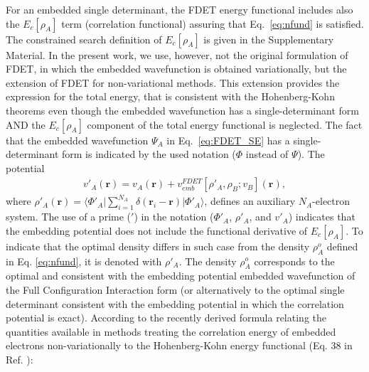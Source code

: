 \documentclass[amsmath,amssymb,preprint,aip,jcp]{revtex4-1}
\begin{document}
For an embedded single determinant, {\color{red}the FDET energy functional  includes also the $E_c[\rho_A]$ term (correlation functional)  assuring that   Eq.~\ref{eq:nfund} is satisfied. The constrained search definition of $E_c[\rho_A]$ is given in the Supplementary Material. }
{\color{red}
In the present work, we use, however, not the original formulation of FDET, in which  the embedded wavefunction is obtained variationally, but the extension of FDET for non-variational methods\cite{Wesolowski2020}. 
This extension provides the expression for the total energy, that is consistent with the Hohenberg-Kohn theorems even though the embedded wavefunction has a single-determinant form AND the $E_c[\rho_A]$ component of the total energy functional is neglected.} 
The fact that the embedded  wavefunction $\Psi_A$ in Eq.~\ref{eq:FDET_SE} has a single-determinant form is indicated by the used notation ($\Phi$ instead of $\Psi$). 
The potential
\begin{eqnarray}
v'_A(\mathbf{r})=v_A(\mathbf{r})+v_{emb}^{{FDET}}[\rho'_A,\rho_B; v_B](\mathbf{r})\label{eq:def_v'},
\end{eqnarray}
where $\rho'_A(\mathbf{r})=\langle\Phi'_A\vert\sum_{i=1}^{N_{A}}\delta(\mathbf{r}_i-\mathbf{r})\vert\Phi'_A\rangle$, defines an auxiliary $N_A$-electron system. The use of a prime ($'$) in the notation ($\Phi'_A$, $\rho'_A$, and $v'_A$) indicates 
that the embedding potential does not include the functional derivative of $E_c[\rho_A]$. 
To indicate that the optimal density differs in such case from the density $\rho^{o}_A$ defined in Eq. \ref{eq:nfund}, it is denoted with $\rho'_A$.  The density $\rho^{o}_A$ corresponds to the optimal and consistent with the embedding potential embedded wavefunction of the Full {\color{red}Configuration Interaction} form (or alternatively to the optimal single determinant consistent with the embedding potential in which the correlation potential is exact).  
According to the recently derived formula relating the quantities available in methods treating the correlation energy of embedded electrons non-variationally to the Hohenberg-Kohn energy functional (Eq. 38 in Ref. ): 
\end{document}
